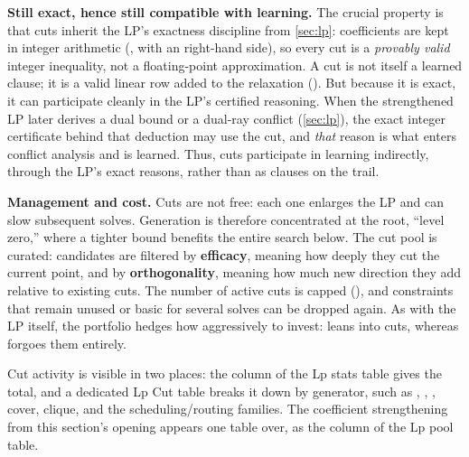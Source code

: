 \textbf{Still exact, hence still compatible with learning.} The crucial property
is that cuts inherit the LP's exactness discipline from \cref{sec:lp}:
coefficients are kept in integer arithmetic (, with an
 right-hand side), so every cut is a \emph{provably valid} integer
inequality, not a floating-point approximation. A cut is not itself a learned
clause; it is a valid linear row added to the relaxation
(). But
because it is exact, it can participate cleanly in the LP's certified reasoning.
When the strengthened LP later derives a dual bound or a dual-ray conflict
(\cref{sec:lp}), the exact integer certificate behind that deduction may
use the cut, and \emph{that} reason is what enters conflict analysis and is
learned. Thus, cuts participate in learning indirectly, through the LP's exact
reasons, rather than as clauses on the trail.

\textbf{Management and cost.} Cuts are not free: each one enlarges the LP and
can slow subsequent solves. Generation is therefore concentrated at the root,
``level zero,'' where a tighter bound benefits the entire search below. The cut
pool is curated: candidates are filtered by \textbf{efficacy}, meaning how deeply
they cut the current point, and by \textbf{orthogonality}, meaning how much new
direction they add relative to existing cuts. The number of active cuts is capped
(), and constraints that remain unused or
basic for several solves can be dropped again. As with the LP itself, the
portfolio hedges how aggressively to invest:  leans into cuts,
whereas  forgoes them entirely.

\begin{platypuslog}[htb]
Cut activity is visible in two places: the  column of the
\textsf{Lp stats} table gives the total, and a dedicated \textsf{Lp Cut} table
breaks it down by generator, such as , ,
, cover, clique, and the scheduling/routing families. The
coefficient strengthening from this section's opening appears one table over, as
the  column of the \textsf{Lp pool} table.
\end{platypuslog}
